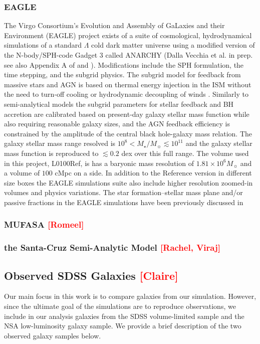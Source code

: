 \documentclass[preprint2,tighten]{aastex62}
\newcommand{\todo}[1]{{\bf \textcolor{red}{ #1}}}
\begin{document}
\subsubsection{EAGLE}
The Virgo Consortium's Evolution and Assembly of GaLaxies and their Environment (EAGLE) project \citep{schaye2015, crain2015} exists of a suite of cosmological, hydrodynamical simulations of a standard $\Lambda$ cold dark matter universe using a modified version of the N-body/SPH-code Gadget 3 \citep[lastly described in][]{springel2005} called ANARCHY (Dalla Vecchia et al. in prep. see also Appendix A of \citealp{schaye2015} and \citealp{schaller2015}). Modifications include the SPH formulation, the time stepping, and the subgrid physics. The subgrid model for feedback from massive stars and AGN is based on thermal energy injection in the ISM without the need to turn-off cooling or hydrodynamic decoupling of winds \citep{dallavecchia2012}. Similarly to semi-analytical models the subgrid parameters for stellar feedback and BH accretion are calibrated based on present-day galaxy stellar mass function while also requiring reasonable galaxy sizes, and the AGN feedback efficiency is constrained by the amplitude of the central black hole-galaxy mass relation. The galaxy stellar mass range resolved is $10^{8} < M_{\star}/M_{\sun} \lesssim 10^{11}$ and the galaxy stellar mass function is reproduced to $\lesssim 0.2$ dex over this full range. The volume used in this project, L0100Ref, is has a baryonic mass resolution of $1.81\times 10^6M_{\sun}$ and a volume of $100$ cMpc on a side. In addition to the Reference version in different size boxes the EAGLE simulations suite also include higher resolution zoomed-in volumes and physics variations. The star formation--stellar mass plane and/or passive fractions in the EAGLE simulations have been previously discussed in \citet{furlong2015, trayford2015, trayford2016, trayford2017}


\subsubsection{MUFASA \todo{[Romeel]}}

\subsubsection{the Santa-Cruz Semi-Analytic Model \todo{[Rachel, Viraj]}}

\subsection{Observed SDSS Galaxies \todo{[Claire]}} \label{sec:obvs}
Our main focus in this work is to compare galaxies from our simulation. 
However, since the ultimate goal of the simulations are to reproduce 
observations, we include in our analysis galaxies from the 
SDSS volume-limited sample and the NSA low-luminosity galaxy sample. 
We provide a brief description of the two observed galaxy samples 
below. 
\end{document}

